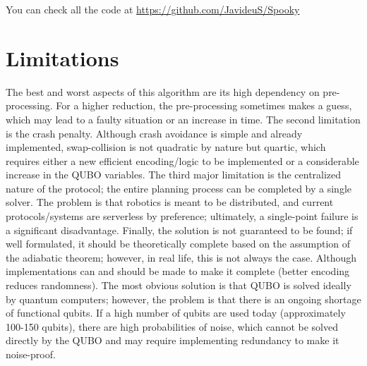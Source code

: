 \documentclass[11pt]{article}
\begin{document}
You can check all the code at \url{https://github.com/JavideuS/Spooky}

\section{Limitations}

The best and worst aspects of this algorithm are its high dependency on pre-processing. For a higher reduction, the pre-processing sometimes makes a guess, which may lead to a faulty situation or an increase in time. The second limitation is the crash penalty. Although crash avoidance is simple and already implemented, swap-collision is not quadratic by nature but quartic, which requires either a new efficient encoding/logic to be implemented or a considerable increase in the QUBO variables. The third major limitation is the centralized nature of the protocol; the entire planning process can be completed by a single solver. The problem is that robotics is meant to be distributed, and current protocols/systems are serverless by preference; ultimately, a single-point failure is a significant disadvantage. Finally, the solution is not guaranteed to be found; if well formulated, it should be theoretically complete based on the assumption of the adiabatic theorem; however, in real life, this is not always the case. Although implementations can and should be made to make it complete (better encoding reduces randomness). The most obvious solution is that QUBO is solved ideally by quantum computers; however, the problem is that there is an ongoing shortage of functional qubits. If a high number of qubits are used today (approximately 100-150 qubits), there are high probabilities of noise, which cannot be solved directly by the QUBO and may require implementing redundancy to make it noise-proof.


\nocite{SparseLinearAlgebra}
\nocite{QuantumAnnealer}


\end{document}
